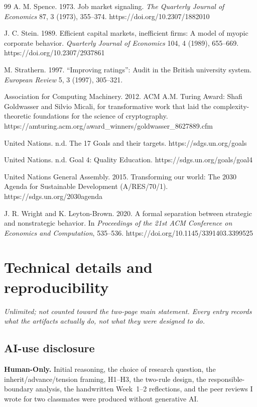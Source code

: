 \begin{thebibliography}{99}
A. M. Spence. 1973.
Job market signaling.
\emph{The Quarterly Journal of Economics} 87, 3 (1973), 355--374.
https://doi.org/10.2307/1882010

J. C. Stein. 1989.
Efficient capital markets, inefficient firms: A model of myopic corporate behavior.
\emph{Quarterly Journal of Economics} 104, 4 (1989), 655--669.
https://doi.org/10.2307/2937861

M. Strathern. 1997.
``Improving ratings'': Audit in the British university system.
\emph{European Review} 5, 3 (1997), 305--321.

Association for Computing Machinery. 2012.
ACM A.M. Turing Award: Shafi Goldwasser and Silvio Micali, for transformative
work that laid the complexity-theoretic foundations for the science of
cryptography.
https://amturing.acm.org/award\_winners/goldwasser\_8627889.cfm

United Nations. n.d.
The 17 Goals and their targets.
https://sdgs.un.org/goals

United Nations. n.d.
Goal 4: Quality Education.
https://sdgs.un.org/goals/goal4

United Nations General Assembly. 2015.
Transforming our world: The 2030 Agenda for Sustainable Development (A/RES/70/1).
https://sdgs.un.org/2030agenda

J. R. Wright and K. Leyton-Brown. 2020.
A formal separation between strategic and nonstrategic behavior.
In \emph{Proceedings of the 21st ACM Conference on Economics and Computation}, 535--536.
https://doi.org/10.1145/3391403.3399525

\end{thebibliography}

\clearpage
\appendix
\section{Technical details and reproducibility}
\emph{Unlimited; not counted toward the two-page main statement. Every entry
records what the artifacts actually do, not what they were designed to do.}

\subsection{AI-use disclosure}
\textbf{Human-Only.} Initial reasoning, the choice of research question, the
inherit/advance/tension framing, H1--H3, the two-rule design, the
responsible-boundary analysis, the handwritten Week~1--2 reflections, and the
peer reviews I wrote for two classmates were produced without generative AI.

